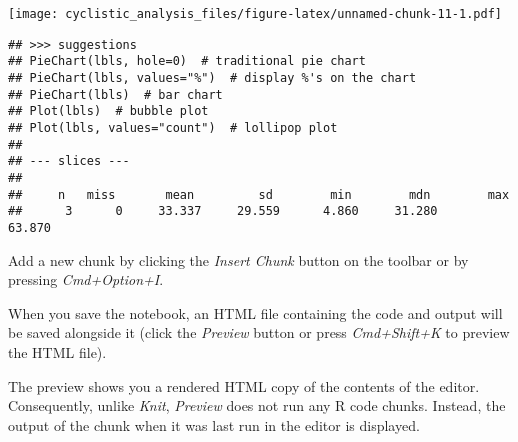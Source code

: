 \documentclass[
]{article}
\begin{document}
\texttt{[image: cyclistic\_analysis\_files/figure-latex/unnamed-chunk-11-1.pdf]}

\begin{verbatim}
## >>> suggestions
## PieChart(lbls, hole=0)  # traditional pie chart
## PieChart(lbls, values="%")  # display %'s on the chart
## PieChart(lbls)  # bar chart
## Plot(lbls)  # bubble plot
## Plot(lbls, values="count")  # lollipop plot 
## 
## --- slices --- 
##  
##     n   miss       mean         sd        min        mdn        max 
##      3      0     33.337     29.559      4.860     31.280     63.870
\end{verbatim}

Add a new chunk by clicking the \emph{Insert Chunk} button on the
toolbar or by pressing \emph{Cmd+Option+I}.

When you save the notebook, an HTML file containing the code and output
will be saved alongside it (click the \emph{Preview} button or press
\emph{Cmd+Shift+K} to preview the HTML file).

The preview shows you a rendered HTML copy of the contents of the
editor. Consequently, unlike \emph{Knit}, \emph{Preview} does not run
any R code chunks. Instead, the output of the chunk when it was last run
in the editor is displayed.
\end{document}
